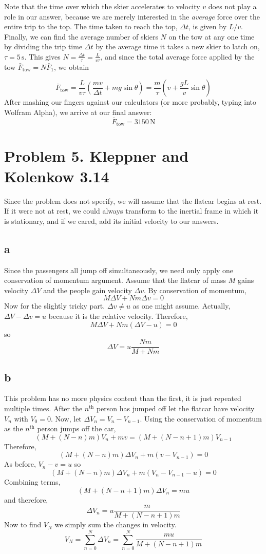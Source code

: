 \documentclass[11pt]{article}
\begin{document}
Note that the time over which the skier accelerates to velocity $v$ does not play a role in our answer, because we are merely interested in the \emph{average} force over the entire trip to the top. The time taken to reach the top, $\Delta t$, is given by $L/v$.\\
\indent
Finally, we can find the average number of skiers $N$ on the tow at any one time by dividing the trip time $\Delta t$ by the average time it takes a new skier to latch on, $\tau = 5 \, \textrm{s}$. This gives $N = \frac{\Delta t}{\tau} = \frac{L}{v\tau}$, and since the total average force applied by the tow $\bar{F}_{\textrm{tow}} = N\bar{F}_{1}$, we obtain

$$\bar{F}_{\textrm{tow}} = \frac{L}{v\tau}\left(\frac{mv}{\Delta t} + mg \sin{\theta} \right) = \frac{m}{\tau} \left( v + \frac{gL}{v} \sin{\theta}\right)$$
After mashing our fingers against our calculators (or more probably, typing into Wolfram Alpha), we arrive at our final answer:
$$\bar{F}_{\textrm{tow}} = 3150 \, \textrm{N}$$

\section*{Problem 5. Kleppner and Kolenkow 3.14}

Since the problem does not specify, we will assume that the flatcar begins at rest. If it were not at rest, we could always transform to the inertial frame in which it is stationary, and if we cared, add its initial velocity to our answers.

\subsection*{a}

Since the passengers all jump off simultaneously, we need only apply one conservation of momentum argument. Assume that the flatcar of mass $M$ gains velocity $\Delta V$ and the people gain velocity $\Delta v$. By conservation of momentum,
\[M\Delta V + N m \Delta v = 0\]
Now for the slightly tricky part. $\Delta v \neq u$ as one might assume. Actually, $\Delta V - \Delta v = u$ because it is the relative velocity. 
Therefore,
\[M \Delta V + N m (\Delta V - u) = 0 \]
so \[\Delta V = u \frac{N m}{M + Nm} \]
\subsection*{b}

This problem has no more physics content than the first, it is just repeated multiple times. After the $n^{\text{th}}$ person has jumped off let the flatcar have velocity $V_n$ with $V_0 = 0$. Now, let $\Delta V_n = V_n - V_{n-1}$. Using the conservation of momentum as the $n^{\text{th}}$ person jumps off the car, \[(M + (N - n) m) V_n + m v = (M + (N - n + 1) m) V_{n-1}\]   
Therefore, 
 \[(M + (N - n) m) \Delta V_n + m (v - V_{n-1}) = 0\] 
As before, $V_{n} - v = u$ so 
 \[(M + (N - n) m) \Delta V_n + m (V_{n} - V_{n-1} - u) = 0\]
Combining terms,  
 \[(M + (N - n + 1) m) \Delta V_n = m u \]
and therefore,
\[\Delta V_n = u \frac{m}{M + (N - n + 1)m}\]
Now to find $V_N$ we simply sum the changes in velocity. 
\[V_N = \sum_{n = 0}^{N} \Delta V_n = \sum_{n = 0}^{N} \frac{mu}{M + (N - n + 1)m} \]
\end{document}
